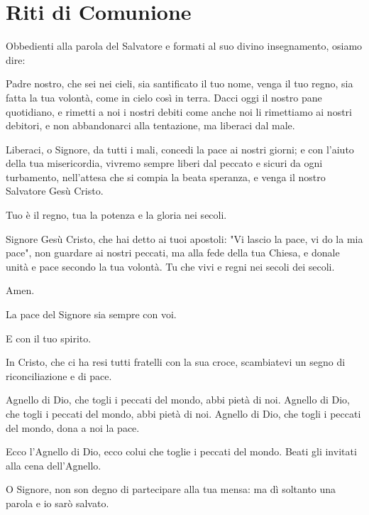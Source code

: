 

\section*{Riti di Comunione}

	\begin{dialoghi}
		\item[\sacerdote] Obbedienti alla parola del Salvatore e formati al suo divino insegnamento, osiamo dire:
		\item[\assemblea] Padre nostro, che sei nei cieli, sia santificato il tuo nome, venga il tuo regno, sia fatta la tua volontà, come in cielo così in terra. Dacci oggi il nostro pane quotidiano, e rimetti a noi i nostri debiti come anche noi li rimettiamo ai nostri debitori, e non abbandonarci alla tentazione, ma liberaci dal male.
		\item[\sacerdote] Liberaci, o Signore, da tutti i mali, concedi la pace ai nostri giorni; e con l'aiuto della tua misericordia, vivremo sempre liberi dal peccato e sicuri da ogni turbamento, nell'attesa che si compia la beata speranza, e venga il nostro Salvatore Gesù Cristo.
		\item[\assemblea] Tuo è il regno, tua la potenza e la gloria nei secoli.
		\item[\sacerdote] Signore Gesù Cristo, che hai detto ai tuoi apostoli: "Vi lascio la pace, vi do la mia pace", non guardare ai nostri peccati, ma alla fede della tua Chiesa, e donale unità e pace secondo la tua volontà. Tu che vivi e regni nei secoli dei secoli.
		\item[\assemblea] Amen.
		\item[\sacerdote] La pace del Signore sia sempre con voi.
		\item[\assemblea] E con il tuo spirito.
		\item[\sacerdote] In Cristo, che ci ha resi tutti fratelli con la sua croce, scambiatevi un segno di riconciliazione e di pace.

		\item[\assemblea] Agnello di Dio, che togli i peccati del mondo, abbi pietà di noi. Agnello di Dio, che togli i peccati del mondo, abbi pietà di noi. Agnello di Dio, che togli i peccati del mondo, dona a noi la pace.
		\item[\sacerdote] Ecco l'Agnello di Dio, ecco colui che toglie i peccati del mondo. Beati gli invitati alla cena dell'Agnello.
		\item[\assemblea] O Signore, non son degno di partecipare alla tua mensa: ma dì soltanto una parola e io sarò salvato.
	\end{dialoghi}

